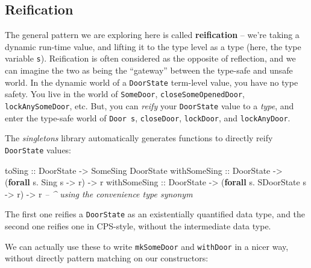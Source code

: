 \documentclass[]{article}
\newenvironment{Shaded}{}{}
\newcommand{\CommentTok}[1]{\textcolor[rgb]{0.38,0.63,0.69}{\textit{#1}}}
\newcommand{\DataTypeTok}[1]{\textcolor[rgb]{0.56,0.13,0.00}{#1}}
\newcommand{\KeywordTok}[1]{\textcolor[rgb]{0.00,0.44,0.13}{\textbf{#1}}}
\newcommand{\NormalTok}[1]{#1}
\newcommand{\OperatorTok}[1]{\textcolor[rgb]{0.40,0.40,0.40}{#1}}
\newcommand{\OtherTok}[1]{\textcolor[rgb]{0.00,0.44,0.13}{#1}}
\begin{document}
\hypertarget{reification}{%
\subsection{Reification}\label{reification}}

The general pattern we are exploring here is called \textbf{reification} --
we're taking a dynamic run-time value, and lifting it to the type level as a
type (here, the type variable \texttt{s}). Reification is often considered as
the opposite of reflection, and we can imagine the two as being the ``gateway''
between the type-safe and unsafe world. In the dynamic world of a
\texttt{DoorState} term-level value, you have no type safety. You live in the
world of \texttt{SomeDoor}, \texttt{closeSomeOpenedDoor},
\texttt{lockAnySomeDoor}, etc. But, you can \emph{reify} your \texttt{DoorState}
value to a \emph{type}, and enter the type-safe world of \texttt{Door\ s},
\texttt{closeDoor}, \texttt{lockDoor}, and \texttt{lockAnyDoor}.

The \emph{singletons} library automatically generates functions to directly
reify \texttt{DoorState} values:

\begin{Shaded}
\begin{Highlighting}[]
\OtherTok{toSing       ::} \DataTypeTok{DoorState} \OtherTok{->} \DataTypeTok{SomeSing} \DataTypeTok{DoorState}
\OtherTok{withSomeSing ::} \DataTypeTok{DoorState} \OtherTok{->}\NormalTok{ (}\KeywordTok{forall}\NormalTok{ s}\OperatorTok{.} \DataTypeTok{Sing}\NormalTok{ s        }\OtherTok{->}\NormalTok{ r) }\OtherTok{->}\NormalTok{ r}
\OtherTok{withSomeSing ::} \DataTypeTok{DoorState} \OtherTok{->}\NormalTok{ (}\KeywordTok{forall}\NormalTok{ s}\OperatorTok{.} \DataTypeTok{SDoorState}\NormalTok{ s  }\OtherTok{->}\NormalTok{ r) }\OtherTok{->}\NormalTok{ r}
                                     \CommentTok{-- ^ using the convenience type synonym}
\end{Highlighting}
\end{Shaded}

The first one reifies a \texttt{DoorState} as an existentially quantified data
type, and the second one reifies one in CPS-style, without the intermediate data
type.

We can actually use these to write \texttt{mkSomeDoor} and \texttt{withDoor} in
a nicer way, without directly pattern matching on our constructors:
\end{document}
